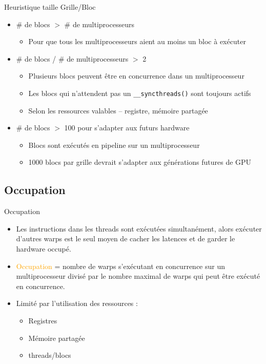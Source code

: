\documentclass[handout,francais]{beamer}
\begin{document}
\begin{frame}{Heuristique taille Grille/Bloc}

  \begin{itemize}
  \item \# de blocs $>$ \# de multiprocesseurs
    \begin{itemize}
    \item Pour que tous les multiprocesseurs aient au moins un bloc à exécuter
    \end{itemize}
  \item \# de blocs / \# de multiprocesseurs $>$ 2
    \begin{itemize}
    \item Plusieurs blocs peuvent être en concurrence dans un multiprocesseur
    \item Les blocs qui n'attendent pas un  \texttt{\_\_syncthreads()} sont toujours actifs
    \item Selon les ressources valables -- registre, mémoire partagée
    \end{itemize}
  \item \# de blocs $>$ 100 pour s'adapter aux futurs hardware
    \begin{itemize}
    \item Blocs sont exécutés en pipeline sur un multiprocesseur
    \item 1000 blocs par grille devrait s'adapter aux générations futures de GPU
    \end{itemize}
  \end{itemize}
\end{frame}

\subsection{Occupation}

\begin{frame}{Occupation}

  \begin{itemize}
  \item Les instructions dans les threads sont exécutées simultanément, alors 
    exécuter d'autres warps est le seul moyen de cacher les latences et de
    garder le hardware occupé.
  \item \textcolor{orange}{Occupation} = nombre de warps
    s'exécutant en concurrence sur un multiprocesseur divisé
    par le nombre maximal de warps qui peut être exécuté en concurrence.
  \item Limité par l'utilisation des ressources :
    \begin{itemize}
    \item Registres
    \item Mémoire partagée
    \item threads/blocs
    \end{itemize}
\end{itemize}
\end{frame}
\end{document}
